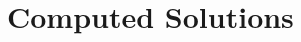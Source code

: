 \documentclass[12pt, twoside]{amsart}
\theoremstyle{definition}
\begin{document}


\newpage
\appendix
\section{Computed Solutions}\label{app:solutions}
\end{document}
